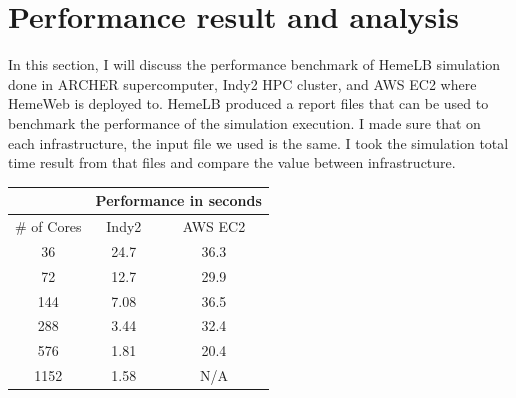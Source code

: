 \section{Performance result and analysis}

In this section, I will discuss the performance benchmark of HemeLB simulation done in ARCHER supercomputer, Indy2 HPC cluster, and AWS EC2 where HemeWeb is deployed to. HemeLB produced a report files that can be used to benchmark the performance of the simulation execution. I made sure that on each infrastructure, the input file we used is the same. I took the simulation total time result from that files and compare the value between infrastructure.


\begin{center}

\label{table:perf}

\begin{tabular}{|c|c|c|}
\hline
\multicolumn{1}{|l|}{}            & \multicolumn{2}{c|}{Performance in seconds}               \\ \hline
\multicolumn{1}{|c|}{\# of Cores} & \multicolumn{1}{c|}{Indy2} & \multicolumn{1}{c|}{AWS EC2} \\ \hline
36                                & 24.7                       & 36.3                         \\ \hline
72                                & 12.7                       & 29.9                         \\ \hline
144                               & 7.08                       & 36.5                         \\ \hline
288                               & 3.44                       & 32.4                         \\ \hline
576                               & 1.81                       & 20.4                         \\ \hline
1152                              & 1.58                       & N/A                             \\ \hline
\end{tabular}

\end{center}



\vspace{1cm}

